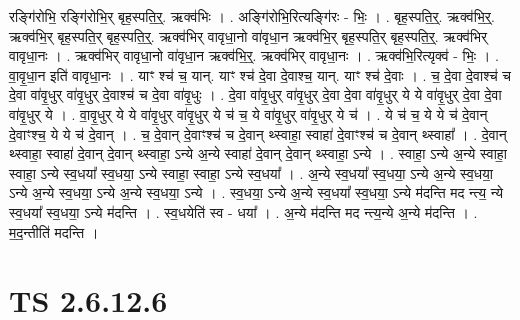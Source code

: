 \documentclass[17pt]{extarticle}
\begin{document}
रङ्गि॑रोभि॒ रङ्गि॑रोभि॒र् बृह॒स्पति॒र्॒. ऋक्व॑भिः । . अङ्गि॑रोभि॒रित्यङ्गि॑रः - भिः॒ । . बृह॒स्पति॒र्॒. ऋक्व॑भि॒र्॒. ऋक्व॑भि॒र् बृह॒स्पति॒र् बृह॒स्पति॒र्॒. ऋक्व॑भिर् वावृधा॒नो वा॑वृधा॒न ऋक्व॑भि॒र् बृह॒स्पति॒र् बृह॒स्पति॒र्॒. ऋक्व॑भिर् वावृधा॒नः । . ऋक्व॑भिर् वावृधा॒नो वा॑वृधा॒न ऋक्व॑भि॒र्॒. ऋक्व॑भिर् वावृधा॒नः । . ऋक्व॑भि॒रित्यृक्व॑ - भिः॒ । . वा॒वृ॒धा॒न इति॑ वावृधा॒नः । . याꣳ श्च॑ च॒ यान्. याꣳ श्च॑ दे॒वा दे॒वाश्च॒ यान्. याꣳ श्च॑ दे॒वाः । . च॒ दे॒वा दे॒वाश्च॑ च दे॒वा वा॑वृ॒धुर् वा॑वृ॒धुर् दे॒वाश्च॑ च दे॒वा वा॑वृ॒धुः । . दे॒वा वा॑वृ॒धुर् वा॑वृ॒धुर् दे॒वा दे॒वा वा॑वृ॒धुर् ये ये वा॑वृ॒धुर् दे॒वा दे॒वा वा॑वृ॒धुर् ये । . वा॒वृ॒धुर् ये ये वा॑वृ॒धुर् वा॑वृ॒धुर् ये च॑ च॒ ये वा॑वृ॒धुर् वा॑वृ॒धुर् ये च॑ । . ये च॑ च॒ ये ये च॑ दे॒वान् दे॒वाꣳश्च॒ ये ये च॑ दे॒वान् । . च॒ दे॒वान् दे॒वाꣳश्च॑ च दे॒वान् थ्स्वाहा॒ स्वाहा॑ दे॒वाꣳश्च॑ च दे॒वान् थ्स्वाहा᳚ । . दे॒वान् थ्स्वाहा॒ स्वाहा॑ दे॒वान् दे॒वान् थ्स्वाहा॒ ऽन्ये अ॒न्ये स्वाहा॑ दे॒वान् दे॒वान् थ्स्वाहा॒ ऽन्ये । . स्वाहा॒ ऽन्ये अ॒न्ये स्वाहा॒ स्वाहा॒ ऽन्ये स्व॒धया᳚ स्व॒धया॒ ऽन्ये स्वाहा॒ स्वाहा॒ ऽन्ये स्व॒धया᳚ । . अ॒न्ये स्व॒धया᳚ स्व॒धया॒ ऽन्ये अ॒न्ये स्व॒धया॒ ऽन्ये अ॒न्ये स्व॒धया॒ ऽन्ये अ॒न्ये स्व॒धया॒ ऽन्ये । . स्व॒धया॒ ऽन्ये अ॒न्ये स्व॒धया᳚ स्व॒धया॒ ऽन्ये म॑दन्ति मद न्त्य॒ न्ये स्व॒धया᳚ स्व॒धया॒ ऽन्ये म॑दन्ति । . स्व॒धयेति॑ स्व - धया᳚ । . अ॒न्ये म॑दन्ति मद न्त्य॒न्ये अ॒न्ये म॑दन्ति । . म॒द॒न्तीति॑ मदन्ति । \newline
\pagebreak
{}

\section{ TS 2.6.12.6 }
\end{document}

